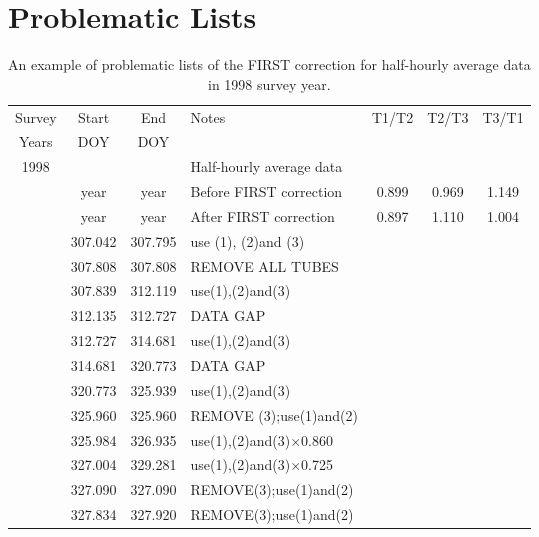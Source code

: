\appendix

\chapter{Problematic Lists}



\begin{table}[!h]
\centering \caption{An example of problematic lists of the FIRST
correction for half-hourly average data in 1998 survey year.}
\label{problematiclists1}
    \begin{tabular}{ | c | c | c | p{5.5cm} | c | c | c |}
    \hline
    Survey & Start & End & Notes & T1/T2 & T2/T3 & T3/T1 \\ %
    Years & DOY & DOY &  &  &  &  \\ \hline
    1998 &      &      & Half-hourly average data & & & \\ \hline
         & year & year & Before FIRST correction & 0.899 & 0.969 & 1.149\\
         & year & year & After FIRST correction & 0.897 & 1.110 &
         1.004\\ \hline
             &   307.042 &   307.795 &   use (1), (2)and (3) &       &       &       \\
    &   307.808 &   307.808 &   REMOVE ALL TUBES    &       &       &       \\
    &   307.839 &   312.119 &   use(1),(2)and(3) &       &       &       \\
    &   312.135 &   312.727 &   DATA GAP    &       &       &       \\
    &   312.727 &   314.681 &   use(1),(2)and(3) &       &       &       \\
    &   314.681 &   320.773 &   DATA GAP    &       &       &       \\
    &   320.773 &   325.939 &   use(1),(2)and(3) &       &       &       \\
    &   325.960 &   325.960 &   REMOVE (3);use(1)and(2)  &       &       &       \\
    &   325.984 &   326.935 &   use(1),(2)and(3)$\times$0.860  &       &       &       \\
    &   327.004 &   329.281 &   use(1),(2)and(3)$\times$0.725  &       &       &       \\
    &   327.090 &   327.090 &   REMOVE(3);use(1)and(2)  &       &       &       \\
    &   327.834 &   327.920 &   REMOVE(3);use(1)and(2)  &       &       &       \\

\end{tabular}
\end{table}
